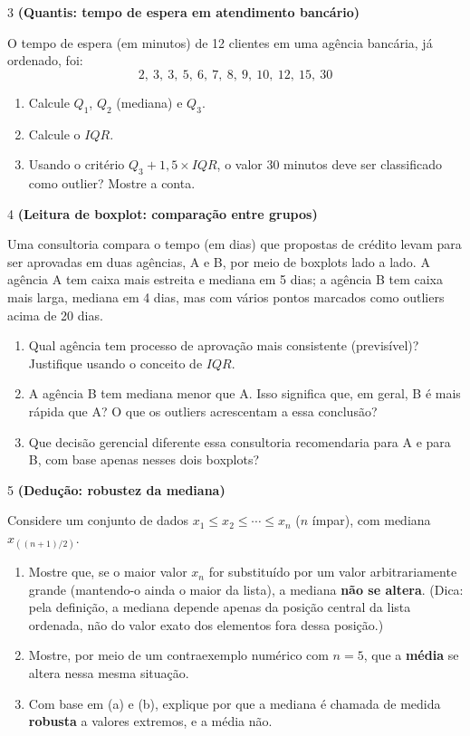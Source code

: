 \documentclass[11pt]{article}
\begin{document}
\begin{questao}{3} \textbf{(Quantis: tempo de espera em atendimento bancário)}

O tempo de espera (em minutos) de 12 clientes em uma agência bancária, já ordenado, foi:
$$
2, \ 3, \ 3, \ 5, \ 6, \ 7, \ 8, \ 9, \ 10, \ 12, \ 15, \ 30
$$

\begin{enumerate}[label=(\alph*)]
  \item Calcule $Q_1$, $Q_2$ (mediana) e $Q_3$.
  \item Calcule o $IQR$.
  \item Usando o critério $Q_3 + 1{,}5\times IQR$, o valor 30 minutos deve ser classificado como
    outlier? Mostre a conta.
\end{enumerate}
\end{questao}

\begin{questao}{4} \textbf{(Leitura de boxplot: comparação entre grupos)}

Uma consultoria compara o tempo (em dias) que propostas de crédito levam para ser aprovadas em
duas agências, A e B, por meio de boxplots lado a lado. A agência A tem caixa mais estreita e
mediana em 5 dias; a agência B tem caixa mais larga, mediana em 4 dias, mas com vários pontos
marcados como outliers acima de 20 dias.

\begin{enumerate}[label=(\alph*)]
  \item Qual agência tem processo de aprovação mais consistente (previsível)? Justifique usando o
    conceito de $IQR$.
  \item A agência B tem mediana menor que A. Isso significa que, em geral, B é mais rápida que A?
    O que os outliers acrescentam a essa conclusão?
  \item Que decisão gerencial diferente essa consultoria recomendaria para A e para B, com base
    apenas nesses dois boxplots?
\end{enumerate}
\end{questao}

\begin{questao}{5} \textbf{(Dedução: robustez da mediana)}

Considere um conjunto de dados $x_1 \le x_2 \le \cdots \le x_n$ ($n$ ímpar), com mediana
$x_{((n+1)/2)}$.

\begin{enumerate}[label=(\alph*)]
  \item Mostre que, se o maior valor $x_n$ for substituído por um valor arbitrariamente grande
    (mantendo-o ainda o maior da lista), a mediana \textbf{não se altera}. (Dica: pela definição, a
    mediana depende apenas da posição central da lista ordenada, não do valor exato dos elementos
    fora dessa posição.)
  \item Mostre, por meio de um contraexemplo numérico com $n=5$, que a \textbf{média} se altera nessa
    mesma situação.
  \item Com base em (a) e (b), explique por que a mediana é chamada de medida \textbf{robusta} a
    valores extremos, e a média não.
\end{enumerate}
\end{questao}
\end{document}
